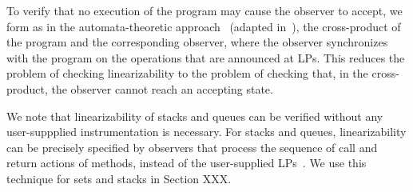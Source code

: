 To verify that no execution of the program may cause the observer to
accept, we form as in the automata-theoretic approach~\cite{VW:modelchecking}
(adapted in~\cite{AHHR:integrated}),
the cross-product of the program  and the corresponding
observer, where the observer synchronizes with the program on the operations
that are announced at LPs. This reduces the
problem of checking linearizability to the problem of checking
that, in the cross-product, the observer cannot reach an accepting state.

We note that linearizability of stacks and queues can be verified without any
user-suppplied instrumentation is necessary. For stacks and queues,
linearizability can be precisely specified by
observers that process the sequence of call and return actions of
methods,  instead of the user-supplied LPs~\cite{BEEH:icalp15,HSV:concur13}.
We use this technique for sets and stacks in Section XXX.



